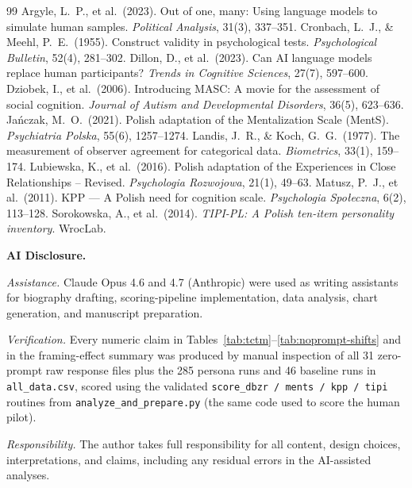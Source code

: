 \documentclass[11pt,a4paper]{article}
\begin{document}
\begin{thebibliography}{99}\footnotesize
{} Argyle, L.~P., et al.\ (2023). Out of one, many: Using language models to simulate human samples. \textit{Political Analysis}, 31(3), 337--351.
 Cronbach, L.~J., \& Meehl, P.~E.\ (1955). Construct validity in psychological tests. \textit{Psychological Bulletin}, 52(4), 281--302.
 Dillon, D., et al.\ (2023). Can AI language models replace human participants? \textit{Trends in Cognitive Sciences}, 27(7), 597--600.
 Dziobek, I., et al.\ (2006). Introducing MASC: A movie for the assessment of social cognition. \textit{Journal of Autism and Developmental Disorders}, 36(5), 623--636.
 Ja\'nczak, M.~O.\ (2021). Polish adaptation of the Mentalization Scale (MentS). \textit{Psychiatria Polska}, 55(6), 1257--1274.
 Landis, J.~R., \& Koch, G.~G.\ (1977). The measurement of observer agreement for categorical data. \textit{Biometrics}, 33(1), 159--174.
 Lubiewska, K., et al.\ (2016). Polish adaptation of the Experiences in Close Relationships -- Revised. \textit{Psychologia Rozwojowa}, 21(1), 49--63.
 Matusz, P.~J., et al.\ (2011). KPP --- A Polish need for cognition scale. \textit{Psychologia Spo{\l}eczna}, 6(2), 113--128.
 Sorokowska, A., et al.\ (2014). \textit{TIPI-PL: A Polish ten-item personality inventory}. WrocLab.
\end{thebibliography}

\vspace{8pt}
\noindent\textbf{AI Disclosure.}

\noindent\textit{Assistance.} Claude Opus 4.6 and 4.7 (Anthropic) were used as writing assistants for biography drafting, scoring-pipeline implementation, data analysis, chart generation, and manuscript preparation.

\noindent\textit{Verification.} Every numeric claim in Tables~\ref{tab:tctm}--\ref{tab:noprompt-shifts} and in the framing-effect summary was produced by manual inspection of all 31 zero-prompt raw response files plus the 285 persona runs and 46 baseline runs in \texttt{all\_data.csv}, scored using the validated \texttt{score\_dbzr / ments / kpp / tipi} routines from \texttt{analyze\_and\_prepare.py} (the same code used to score the human pilot).

\noindent\textit{Responsibility.} The author takes full responsibility for all content, design choices, interpretations, and claims, including any residual errors in the AI-assisted analyses.
\end{document}
